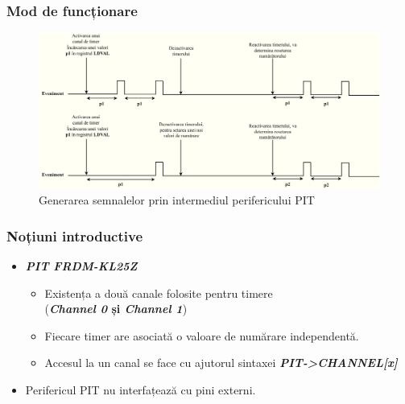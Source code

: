 \documentclass[xcolor={table}]{beamer}
\begin{document}
			\begin{frame}
	    \frametitle{Mod de funcționare}
        \begin{figure}
            \centering
            \includegraphics[width=11.5cm]{images/PIT.drawio (1).png}
            \caption{Generarea semnalelor prin intermediul perifericului PIT}
            \label{fig:my_label}
        \end{figure}
	\end{frame}
		\begin{frame}
	    \frametitle{Noțiuni introductive}
	    \begin{itemize}
	        \item \textbf{\textit{PIT FRDM-KL25Z}}
	        \begin{itemize}
	            \item Existența a două canale folosite pentru timere \\
	            (\textbf{\textit{Channel 0} și \textbf{\textit{Channel 1}}})
	            \item Fiecare timer are asociată o valoare de numărare independentă.
	            \item Accesul la un canal se face cu ajutorul sintaxei \textbf{\textit{PIT->CHANNEL[x]}}
	        \end{itemize}
	        \item Perifericul PIT nu interfațează cu pini externi.
	        
	    \end{itemize}
	\end{frame}
\end{document}
